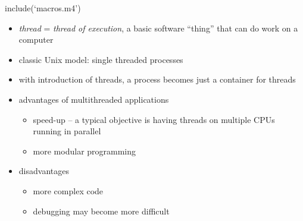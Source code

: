 include(`macros.m4')

\pagebreak
{}

\begin{slide}
\end{slide}


\begin{slide}
\begin{itemize}
\item \emph{thread} = \emph{thread of execution}, a basic software ``thing''
that can do work on a computer
\item classic Unix model: single threaded processes
\item with introduction of threads, a process becomes just a container for
threads
\item advantages of multithreaded applications
  \begin{itemize}
  \item speed-up -- a typical objective is having threads on multiple CPUs
  running in parallel
  \item more modular programming
  \end{itemize}
\item disadvantages
  \begin{itemize}
  \item more complex code
  \item debugging may become more difficult
  \end{itemize}
\end{itemize}
\end{slide}

